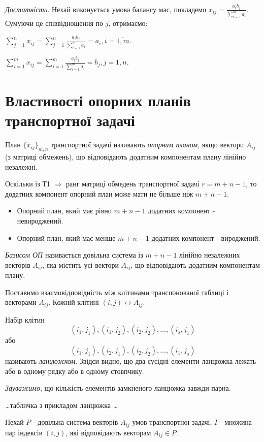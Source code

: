 \documentclass[12pt,a4paper]{book}
\begin{document}
{\it Достатність.} Нехай виконується умова балансу мас, покладемо  $x_{ij} = \frac{a_ib_j}{\sum_{i=1}^m a_i}$. Сумуючи це співвідношення по $j$, отримаємо:

$\sum_{j=1}^n x_{ij} = \sum_{j=1}^n \frac{a_ib_j}{\sum_{i=1}^m a_i} = a_i,  i = \overline{1, m}.$

$\sum_{i=1}^m x_{ij} = \sum_{i=1}^m \frac{a_ib_j}{\sum_{i=1}^m a_i} = b_j,  j = \overline{1, n}.$

\section{Властивості опорних планів транспортної задачі}

План $\{x_{ij}\}_{m,n}$ транспортної задачі називають \emph{опорним планом}, якщо вектори $A_{ij}$ (з матриці обмежень), що відповідають додатним компонентам плану лінійно незалежні.

Оскільки із Т1 $\Rightarrow$ ранг матриці обмедень транспортної задачі $r=m+n-1$, то додатних компонент опорний план може мати не більше ніж $m+n-1$.

\begin{itemize}
  \item Опорний план, який має рівно $m+n-1$ додатних компонент - невироджений.
  \item Опорний план, який має менше $m+n-1$ додатних компонент - вироджений.
\end{itemize}

\emph{Базисом ОП} називається довільна система із $m+n-1$ лінійно незалежних векторів $A_{ij}$, яка містить усі вектори $A_{ij}$, що відповідають додатним компонентам плану.

Поставимо взаємовідповідність між клітинами транспонованої таблиці і векторами $A_{ij}$. Кожній клітині $(i,j) \leftrightarrow A_{ij}$.

Набір клітин $$(i_1,j_1),(i_1,j_2),(i_2,j_2),\dots,(i_s,j_1)$$або$$(i_1,j_1),(i_2,j_1),(i_2,j_2),\dots,(i_1,j_s)$$
називають \emph{ланцюжком}. Звідси видно, що два сусідні елементи ланцюжка лежать або в одному рядку або в одному стовпчику.

\emph{Зауважимо}, що кількість елементів замкненого ланцюжка завжди парна.

\dots табличка з прикладом ланцюжка \dots

Нехай $P$ - довільна система векторів $A_{ij}$ умов транспортної задачі, $I$ - множина пар індексів $(i,j)$, які відповідають векторам $A_{ij} \in P$.
\end{document}
